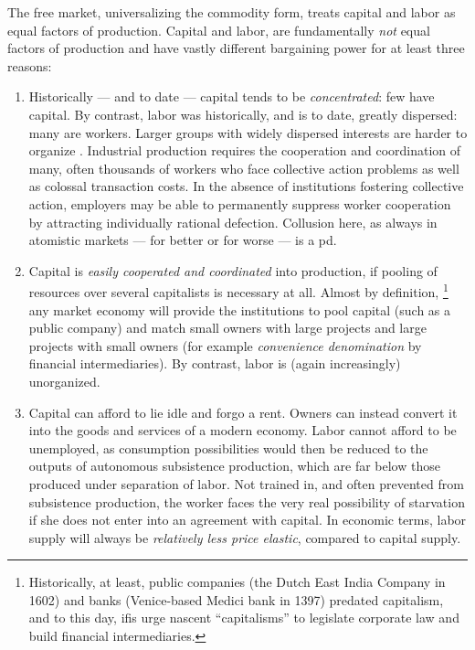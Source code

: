 The free market, universalizing the commodity form, treats capital and labor as equal factors of production.
Capital and labor, are fundamentally \emph{not} equal factors of production and have vastly different bargaining power for at least three reasons:

\begin{enumerate}
	\item Historically --- and to date --- capital tends to be \emph{concentrated}:
	few have capital.
	By contrast, labor was historically, and is to date, greatly dispersed:
	many are workers.
	Larger groups with widely dispersed interests are harder to organize \citep{Olson-1971-aa}.
	Industrial production requires the cooperation and coordination of many, often thousands of workers who face collective action problems as well as colossal transaction costs.
	In the absence of institutions fostering collective action, employers may be able to permanently suppress worker cooperation by attracting individually rational defection.
	Collusion here, as always in atomistic markets --- for better or for worse --- is a \gls{pd}.

	\item Capital is \emph{easily cooperated and coordinated} into production, if pooling of resources over several capitalists is necessary at all.
	Almost by definition,
	\footnote{
		Historically, at least, public companies (the Dutch East India Company in 1602) and banks (Venice-based Medici bank in 1397) predated capitalism, and to this day, \glspl{ifi} urge nascent ``capitalisms'' to legislate corporate law and build financial intermediaries.
	}
	any market economy will provide the institutions to pool capital (such as a public company) and match small owners with large projects and large projects with small owners (for example  \emph{convenience denomination} by financial intermediaries).
	By contrast, labor is (again increasingly) unorganized.

	\item Capital can afford to lie idle and forgo a rent.
	Owners can instead convert it into the goods and services of a modern economy.
	Labor cannot afford to be unemployed, as consumption possibilities would then be reduced to the outputs of autonomous subsistence production, which are far below those produced under separation of labor.
	Not trained in, and often prevented from subsistence production, the worker faces the very real possibility of starvation if she does not enter into an agreement with capital.
	In economic terms, labor supply will always be \emph{relatively less price elastic}, compared to capital supply.
\end{enumerate}

